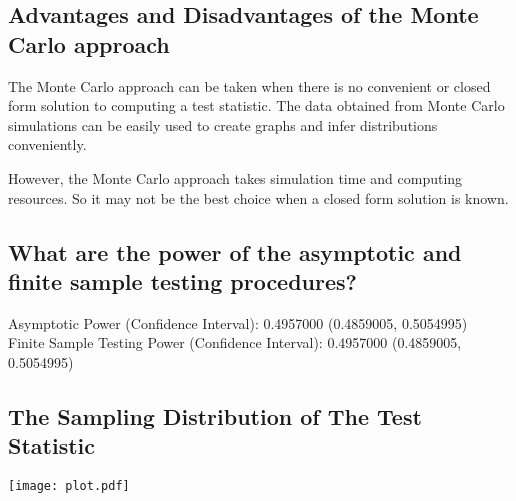 \documentclass{article}
\begin{document}
  \subsection{Advantages and Disadvantages of the Monte Carlo approach}
  The Monte Carlo approach can be taken when there is 
  no convenient or closed form solution to computing 
  a test statistic. The data obtained from Monte 
  Carlo simulations can be easily used to create 
  graphs and infer distributions conveniently.

  However, the Monte Carlo approach takes simulation
  time and computing resources. So it may not be the 
  best choice when a closed form solution is known.
  \subsection{What are the power of the asymptotic and finite sample testing procedures?}
  Asymptotic Power (Confidence Interval): 0.4957000 (0.4859005, 0.5054995)\\
  Finite Sample Testing Power (Confidence Interval): 0.4957000 (0.4859005, 0.5054995)

  \subsection{The Sampling Distribution of The Test Statistic}
  \begin{center}
    \texttt{[image: plot.pdf]}
  \end{center}
\end{document}

